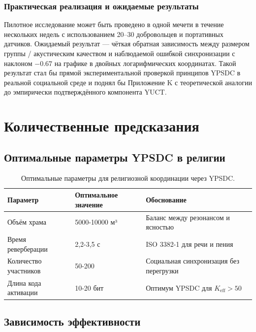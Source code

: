 \documentclass[12pt,a4paper]{article}
\begin{document}
	\subsubsection{Практическая реализация и ожидаемые результаты}
	Пилотное исследование может быть проведено в одной мечети в течение нескольких недель с использованием 20–30 добровольцев и портативных датчиков. Ожидаемый результат — чёткая обратная зависимость между размером группы / акустическим качеством и наблюдаемой ошибкой синхронизации с наклоном \(-0.67\) на графике в двойных логарифмических координатах. Такой результат стал бы прямой экспериментальной проверкой принципов YPSDC в реальной социальной среде и поднял бы Приложение K с теоретической аналогии до эмпирически подтверждённого компонента YUCT.
	
	\section{Количественные предсказания}
	
	\subsection{Оптимальные параметры YPSDC в религии}
	
	\begin{table}[h]
		\centering
		\begin{tabular}{p{}p{}p{}}
			\toprule
			\textbf{Параметр} & \textbf{Оптимальное значение} & \textbf{Обоснование} \\
			\midrule
			Объём храма & 5000-10000 м³ & Баланс между резонансом и ясностью \\
			Время реверберации & 2,2-3,5 с & ISO 3382-1 для речи и пения \\
			Количество участников & 50-200 & Социальная синхронизация без перегрузки \\
			Длина кода активации & 10-20 бит & Оптимум YPSDC для $K_{\mathrm{eff}} > 50$ \\
			\bottomrule
		\end{tabular}
		\caption{Оптимальные параметры для религиозной координации через YPSDC.}
		\label{tab:optimal-params}
	\end{table}
	
	\subsection{Зависимость эффективности}
	
\end{document}
